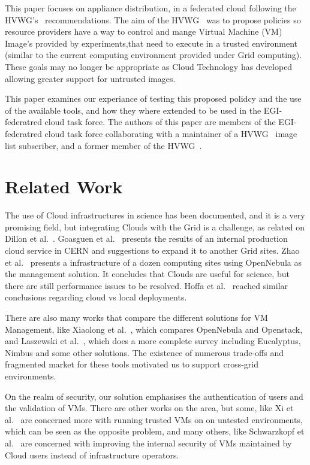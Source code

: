 \documentclass{llncs_Ibergrid2013}
\begin{document}
This paper focuses on appliance distribution, in a federated cloud following the HVWG's~\cite{hepix} recommendations. The aim of the HVWG~\cite{hepix} was to propose policies so resource providers have a way to control and mange Virtual Machine (VM) Image's provided by experiments,that need to execute in a trusted environment (similar to the current computing environment provided under Grid computing). These goals may no longer be appropriate as Cloud Technology has developed allowing greater support for untrusted images.

This paper examines our experiance of testing this proposed polidcy and the use of the available tools, and how they where extended to be used in the EGI-federatred cloud task force. The authors of this paper are members of the EGI-federatred cloud task force collaborating with a maintainer of a HVWG~\cite{hepix} image list subscriber, and a former member of the HVWG~\cite{hepix}.
\section{Related Work}
\label{sect-relatedwork}
The use of Cloud infrastructures in science has been documented, and it is a very promising field, but integrating Clouds with the Grid is a challenge, as related on Dillon et al.~\cite{Dillon2010}. Goasguen et al.~\cite{Goasguen2012} presents the results of an internal production cloud service in CERN and suggestions to expand it to another Grid sites. Zhao et al.~\cite{Zhao2012} presents a infrastructure of a dozen computing sites using OpenNebula as the management solution. It concludes that Clouds are useful for science, but there are still performance issues to be resolved. Hoffa et al.~\cite{Hoffa2008} reached similar conclusions regarding cloud vs local deployments.

There are also many works that compare the different solutions for VM Management, like Xiaolong et al.~\cite{Xiaolong2012}, which compares OpenNebula and Openstack, and Laszewski et al.~\cite{Laszewski2012}, which does a more complete survey including Eucalyptus, Nimbus and some other solutions. The existence of numerous trade-offs and fragmented market for these tools motivated us to support cross-grid environments.

On the realm of security, our solution emphasises the authentication of users and the validation of VMs. There are other works on the area, but some, like Xi et al.~\cite{Xi2012} are concerned more with running trusted VMs on on untested environments, which can be seen as the opposite problem, and many others, like Schwarzkopf et al.~\cite{Schwarzkopf2012} are concerned with improving the internal security of VMs maintained by Cloud users instead of infrastructure operators.
\end{document}
